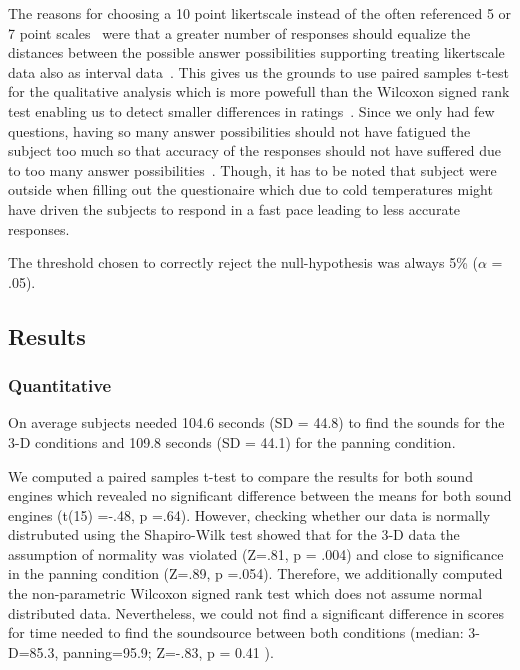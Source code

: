 \documentclass[journal]{IEEEtran}
\begin{document}
The reasons for choosing a 10 point likertscale instead of the often referenced 5 or 7 point scales~\cite{} were that a greater number of responses should equalize the distances between the possible answer possibilities supporting treating likertscale data also as interval data~\cite{}. This gives us the grounds to use paired samples t-test for the qualitative analysis which is more powefull than the Wilcoxon signed rank test enabling us to detect smaller differences in ratings~\cite{}. Since we only had few questions, having so many answer possibilities should not have fatigued the subject too much so that accuracy of the responses should not have suffered due to too many answer possibilities~\cite{}. Though, it has to be noted that subject were outside when filling out the questionaire which due to cold temperatures might have driven the subjects to respond in a fast pace leading to less accurate responses.

The threshold chosen to correctly reject the null-hypothesis was always 5\% ($\alpha$ = .05). 

\subsection{Results}
\subsubsection{Quantitative}
On average subjects needed 104.6 seconds (SD = 44.8) to find the sounds for the 3-D conditions and 109.8 seconds (SD = 44.1) for the panning condition. 

We computed a paired samples t-test to compare the results for both sound engines which revealed no significant difference between the means for both sound engines (t(15) =-.48, p =.64). However, checking whether our data is normally distrubuted using the Shapiro-Wilk test showed that for the 3-D data the assumption of normality was violated (Z=.81, p = .004) and close to significance in the panning condition (Z=.89, p =.054). Therefore, we additionally computed the non-parametric Wilcoxon signed rank test which does not assume normal distributed data. Nevertheless, we could not find a significant difference in scores for time needed to find the soundsource between both conditions (median: 3-D=85.3, panning=95.9; Z=-.83, p = 0.41 ). 
\end{document}
